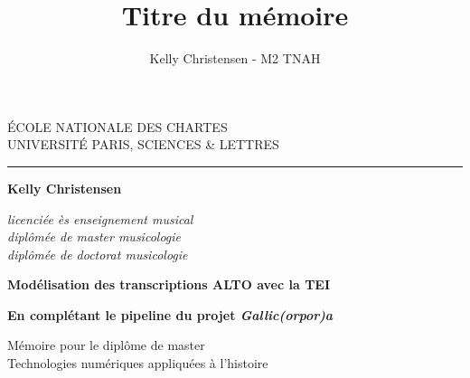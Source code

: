 \documentclass[a4paper,12pt,twoside]{book}
\author{Kelly Christensen - M2 TNAH}
\title{Titre du mémoire}
\begin{document}
	\begin{titlepage}
		\begin{center}
			
			\bigskip
			
			\begin{large}				
				ÉCOLE NATIONALE DES CHARTES\\
				UNIVERSITÉ PARIS, SCIENCES \& LETTRES
			\end{large}
			\begin{center}\rule{2cm}{0.02cm}\end{center}
			
			\bigskip
			\bigskip
			\bigskip
			\begin{Large}
				\textbf{Kelly Christensen}\\
			\end{Large}
			\begin{normalsize} \textit{licenciée ès enseignement musical}\\
				\textit{diplômée de master musicologie}\\
				\textit{diplômée de doctorat musicologie}
			\end{normalsize}
			
			\bigskip
			\bigskip
			\bigskip
			
			\begin{Huge}
				\textbf{Modélisation des transcriptions ALTO avec la TEI}\\
			\end{Huge}
			\bigskip
			\bigskip
			\begin{LARGE}
				\textbf{En complétant le pipeline du projet \textit{Gallic(orpor)a}}\\
			\end{LARGE}
			
			\bigskip
			\bigskip
			\bigskip
			\begin{large}
			\end{large}
			\vfill
			
			\begin{large}
				Mémoire 
				pour le diplôme de master \\
				\og{} Technologies numériques appliquées à l'histoire \fg{} \\
			\end{large}
			
		\end{center}
	\end{titlepage}
	
	\thispagestyle{empty}	
	\cleardoublepage
	
\end{document}
